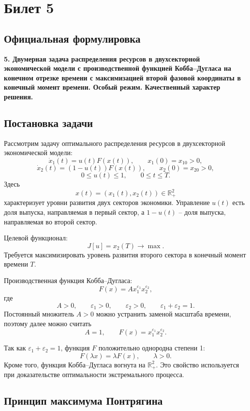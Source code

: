 \documentclass[12pt,a4paper]{article}
\newcommand{\R}{\mathbb{R}}
\newcommand{\eps}{\varepsilon}
\begin{document}
\newpage

\section{Билет 5}

\subsection*{Официальная формулировка}

\textbf{5. Двумерная задача распределения ресурсов в двухсекторной экономической модели с производственной функцией Кобба--Дугласа на конечном отрезке времени с максимизацией второй фазовой координаты в конечный момент времени. Особый режим. Качественный характер решения.}

\subsection{Постановка задачи}

Рассмотрим задачу оптимального распределения ресурсов в двухсекторной экономической модели:
\[
    \dot x_1(t)=u(t)F(x(t)),
    \qquad
    x_1(0)=x_{10}>0,
\]
\[
    \dot x_2(t)=(1-u(t))F(x(t)),
    \qquad
    x_2(0)=x_{20}>0,
\]
\[
    0\le u(t)\le 1,
    \qquad
    0\le t\le T.
\]
Здесь
\[
    x(t)=(x_1(t),x_2(t))\in\R^2_+
\]
характеризует уровни развития двух секторов экономики. Управление \(u(t)\) есть доля выпуска, направляемая в первый сектор, а \(1-u(t)\) -- доля выпуска, направляемая во второй сектор.

Целевой функционал:
\[
    J[u]=x_2(T)\to\max.
\]
Требуется максимизировать уровень развития второго сектора в конечный момент времени \(T\).

Производственная функция Кобба--Дугласа:
\[
    F(x)=Ax_1^{\eps_1}x_2^{\eps_2},
\]
где
\[
    A>0,
    \qquad
    \eps_1>0,
    \qquad
    \eps_2>0,
    \qquad
    \eps_1+\eps_2=1.
\]
Постоянный множитель \(A>0\) можно устранить заменой масштаба времени, поэтому далее можно считать
\[
    A=1,
    \qquad
    F(x)=x_1^{\eps_1}x_2^{\eps_2}.
\]

Так как \(\eps_1+\eps_2=1\), функция \(F\) положительно однородна степени 1:
\[
    F(\lambda x)=\lambda F(x),
    \qquad
    \lambda>0.
\]
Кроме того, функция Кобба--Дугласа вогнута на \(\R^2_+\). Это свойство используется при доказательстве оптимальности экстремального процесса.

\subsection{Принцип максимума Понтрягина}
\end{document}
